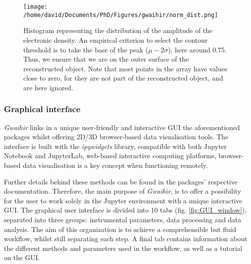 \begin{figure}[!htb]
   \centering
   \texttt{[image: /home/david/Documents/PhD/Figures/gwaihir/norm\_dist.png]}
   \caption{Histogram representing the distribution of the amplitude of the electronic density.
   An empirical criterion to select the contour threshold is to take the base of the peak ($\mu - 2\sigma$), here around 0.75.
   Thus, we ensure that we are on the outer surface of the reconstructed object.
   Note that most points in the array have values close to zero, for they are not part of the reconstructed object, and are here ignored.
   }
   \label{fig:histo}
\end{figure}


\subsubsection{Graphical interface}

\textit{Gwaihir} links in a unique user-friendly and interactive GUI the aforementioned packages whilst offering 2D/3D browser-based data visualisation tools.
The interface is built with the \textit{ipywidgets} library, compatible with both Jupyter Notebook and JupyterLab, web-based interactive computing platforms, browser-based data visualisation is a key concept when functioning remotely.

Further details behind these methods can be found in the packages' respective documentation.
Therefore, the main purpose of \textit{Gwaihir}, is to offer a possibility for the user to work solely in the Jupyter environment with a unique interactive GUI.
The graphical user interface is divided into 10 tabs (fig. \ref{fig:GUI_window}), separated into three groups: instrumental parameters, data processing and data analysis.
The aim of this organization is to achieve a comprehensible but fluid workflow, whilst still separating each step.
A final tab contains information about the different methods and parameters used in the workflow, as well as a tutorial on the GUI.


